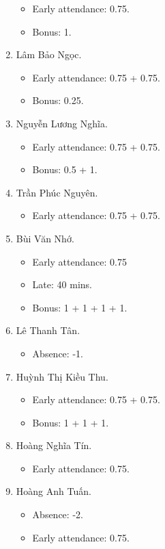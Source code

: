\documentclass{article}
\begin{document}
\begin{enumerate}
	\begin{itemize}
		\item Early attendance: 0.75.
		\item Bonus: 1.
	\end{itemize}
	\item {\sc Lâm Bảo Ngọc.}
	\begin{itemize}
		\item Early attendance: 0.75 + 0.75.
		\item Bonus: 0.25.
	\end{itemize}	
	\item {\sc Nguyễn Lương Nghĩa.}
	\begin{itemize}
		\item Early attendance: 0.75 + 0.75.
		\item Bonus: 0.5 + 1.
	\end{itemize}
	\item {\sc Trần Phúc Nguyên.}
	\begin{itemize}
		\item Early attendance: 0.75 + 0.75.
	\end{itemize}
	\item {\sc Bùi Văn Nhớ}.
	\begin{itemize}
		\item Early attendance: 0.75
		\item Late: 40 mins.
		\item Bonus: 1 + 1 + 1 + 1.	
	\end{itemize}
	\item {\sc Lê Thanh Tân.}
	\begin{itemize}
		\item Absence: -1.
	\end{itemize}
	\item {\sc Huỳnh Thị Kiều Thu.}
	\begin{itemize}
		\item Early attendance: 0.75 + 0.75.
		\item Bonus: 1 + 1 + 1.
	\end{itemize}
	\item {\sc Hoàng Nghĩa Tín.}
	\begin{itemize}
		\item Early attendance: 0.75.
	\end{itemize}
	\item {\sc Hoàng Anh Tuấn.}
	\begin{itemize}
		\item Absence: -2.
		\item Early attendance: 0.75.

\end{itemize}
\end{enumerate}
\end{document}
